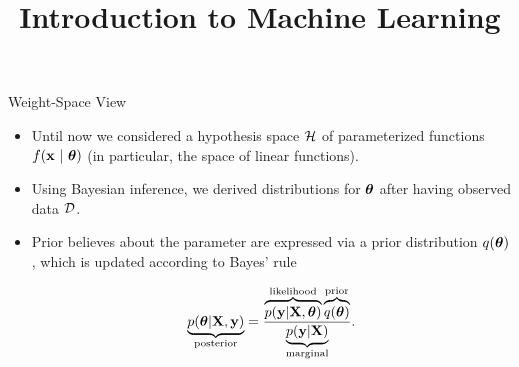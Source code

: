 \documentclass[11pt,compress,t,notes=noshow, xcolor=table]{beamer}
\title{Introduction to Machine Learning}
\begin{document}


%
%
%
%








\begin{vbframe}{Weight-Space View}

\begin{itemize}
  \item Until now we considered a hypothesis space $\mathcal{H}$ of parameterized functions $f(\mathbf{x} ~|~ \bm{\theta})$ (in particular, the space of linear functions). 
  \item Using Bayesian inference, we derived distributions for $\bm{\theta}$ after having observed data $\mathcal{D}$. 
  \item Prior believes about the parameter are expressed via a prior distribution $q(\bm{\theta})$, which is updated according to Bayes' rule 

  $$
  \underbrace{p(\bm{\theta} | \mathbf{X}, \mathbf{y})}_{\text{posterior}} = \frac{\overbrace{p(\mathbf{y} | \mathbf{X}, \bm{\theta})}^{\text{likelihood}}\overbrace{q(\bm{\theta})}^{\text{prior}}}{\underbrace{p(\mathbf{y}|\mathbf{X})}_{\text{marginal}}}. 
  $$
\end{itemize}

\end{vbframe}
\end{document}
